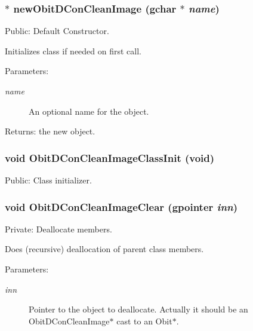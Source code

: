 \subsubsection{$\ast$ new\-Obit\-DCon\-Clean\-Image (gchar $\ast$ {\em name})}\label{ObitDConCleanImage_8c_a7}


Public: Default Constructor. 

Initializes class if needed on first call. \begin{Desc}
\item[Parameters:]
\begin{description}
\item[{\em name}]An optional name for the object. \end{description}
\end{Desc}
\begin{Desc}
\item[Returns:]the new object. \end{Desc}
\subsubsection{\setlength{\rightskip}{0pt plus 5cm}void Obit\-DCon\-Clean\-Image\-Class\-Init (void)}\label{ObitDConCleanImage_8c_a15}


Public: Class initializer. 

\subsubsection{\setlength{\rightskip}{0pt plus 5cm}void Obit\-DCon\-Clean\-Image\-Clear (gpointer {\em inn})}\label{ObitDConCleanImage_8c_a4}


Private: Deallocate members. 

Does (recursive) deallocation of parent class members. \begin{Desc}
\item[Parameters:]
\begin{description}
\item[{\em inn}]Pointer to the object to deallocate. Actually it should be an Obit\-DCon\-Clean\-Image$\ast$ cast to an Obit$\ast$. \end{description}
\end{Desc}
